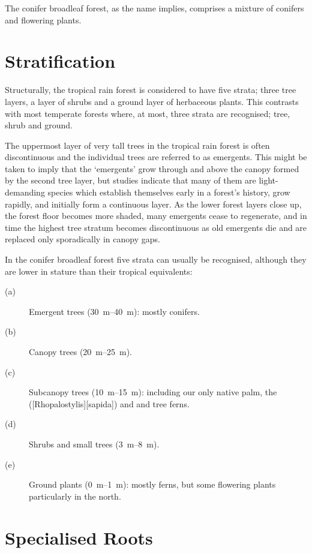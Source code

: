 The conifer broadleaf forest, as the name implies, comprises a mixture of conifers and flowering plants.

\section{Stratification}

Structurally, the tropical rain forest is considered to have five strata; three tree layers, a layer of shrubs and a ground layer of herbaceous plants.
This contrasts with most temperate forests where, at most, three strata are recognised; tree, shrub and ground.

The uppermost layer of very tall trees in the tropical rain forest is often discontinuous and the individual trees are referred to as emergents.
This might be taken to imply that the `emergents' grow through and above the canopy formed by the second tree layer, but studies indicate that many of them are light-demanding species which establish themselves early in a forest's history, grow rapidly, and initially form a continuous layer.
As the lower forest layers close up, the forest floor becomes more shaded, many emergents cease to regenerate, and in time the highest tree stratum becomes discontinuous as old emergents die and are replaced only sporadically in canopy gaps.

In the conifer broadleaf forest five strata can usually be recognised, although they are lower in stature than their tropical equivalents:
\begin{description}
\item[{(a)}]Emergent trees (\SIrange{30}{40}{\metre}): mostly conifers.
\item[{(b)}]Canopy trees (\SIrange{20}{25}{\metre}).
\item[{(c)}]Subcanopy trees (\SIrange{10}{15}{\metre}): including our only native palm, the  ([Rhopalostylis][sapida]) and  and  tree ferns.
\item[{(d)}]Shrubs and small trees (\SIrange{3}{8}{\metre}).
\item[{(e)}]Ground plants (\SIrange{0}{1}{\metre}): mostly ferns, but some flowering plants particularly in the north.
\end{description}
\section{Specialised Roots}

